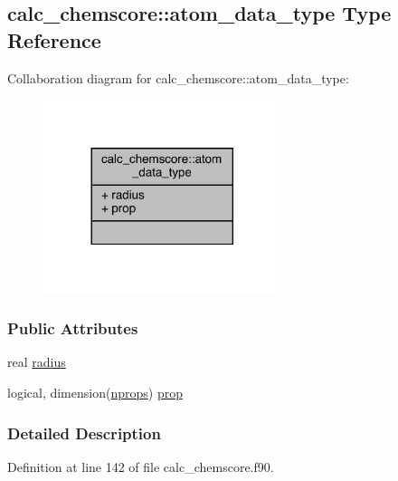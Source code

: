 \hypertarget{structcalc__chemscore_1_1atom__data__type}{\subsection{calc\-\_\-chemscore\-:\-:atom\-\_\-data\-\_\-type Type Reference}
\label{structcalc__chemscore_1_1atom__data__type}
}


Collaboration diagram for calc\-\_\-chemscore\-:\-:atom\-\_\-data\-\_\-type\-:
\nopagebreak
\begin{figure}[H]
\begin{center}
\leavevmode
\includegraphics[width=197pt]{structcalc__chemscore_1_1atom__data__type__coll__graph}
\end{center}
\end{figure}
\subsubsection*{Public Attributes}
\begin{DoxyCompactItemize}
\item 
real \hyperlink{structcalc__chemscore_1_1atom__data__type_aa6e41ac049f305039fdd01be8860b0b9}{radius}
\item 
logical, dimension(\hyperlink{classcalc__chemscore_a21d027f3f912e3305b65b0db008c5053}{nprops}) \hyperlink{structcalc__chemscore_1_1atom__data__type_acdc604d24290d9ddaa57870193661416}{prop}
\end{DoxyCompactItemize}


\subsubsection{Detailed Description}


Definition at line 142 of file calc\-\_\-chemscore.\-f90.




